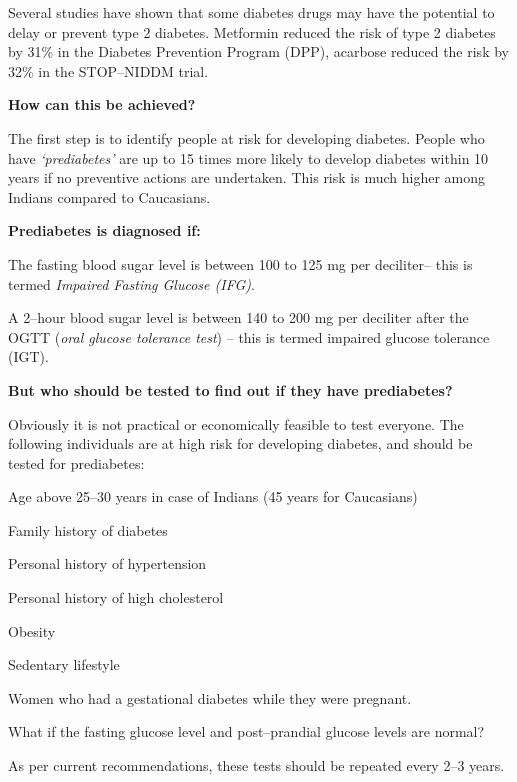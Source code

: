 Several studies have shown that some diabetes drugs may have the potential to delay or prevent type 2 diabetes. Metformin reduced the risk of type 2 diabetes by 31\% in the Diabetes Prevention Program (DPP), acarbose reduced the risk by 32\% in the STOP–NIDDM trial.

\textbf{How can this be achieved?}

The first step is to identify people at risk for developing diabetes. People who have \textit{‘prediabetes’} are up to 15 times more likely to develop diabetes within 10 years if no preventive actions are undertaken. This risk is much higher among Indians compared to Caucasians.

\textbf{Prediabetes is diagnosed if:}

\item The fasting blood sugar level is between 100 to 125 mg per deciliter– this is termed \textit{Impaired Fasting Glucose (IFG)}.

 \item A 2–hour blood sugar level is between 140 to 200 mg per deciliter after the OGTT (\textit{oral glucose tolerance test}) – this is termed impaired glucose tolerance (IGT).

\textbf{But who should be tested to find out if they have prediabetes?}

Obviously it is not practical or economically feasible to test everyone. The following individuals are at high risk for developing diabetes, and should be tested for prediabetes:

\item Age above 25–30 years in case of Indians (45 years for Caucasians)

 \item Family history of diabetes

 \item Personal history of hypertension

 \item Personal history of high cholesterol

 \item Obesity

 \item Sedentary lifestyle

 \item Women who had a gestational diabetes while they were pregnant.

What if the fasting glucose level and post–prandial glucose levels are normal?

As per current recommendations, these tests should be repeated every 2–3 years.

